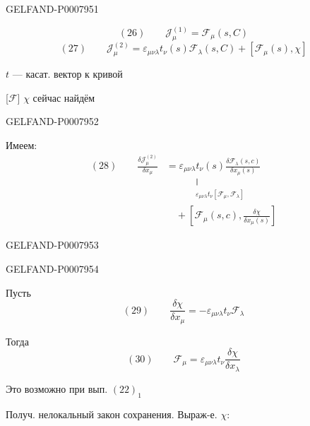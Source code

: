 \begin{GelfandAdjacentEvidence}{GELFAND-P000795}{1}

\[
(26)\qquad\mathcal{J}^{(1)}_\mu=\mathcal{F}_\mu(s,C)
\]
\[
(27)\qquad\mathcal{J}^{(2)}_\mu=
\varepsilon_{\mu\nu\lambda}t_\nu(s)\mathcal{F}_\lambda(s,C)
+[\mathcal{F}_\mu(s),\chi]
\]

\(t\) --- касат. вектор к кривой

[\sout{\(\mathcal F\)}] \(\chi\) сейчас найдём
\end{GelfandAdjacentEvidence}
\begin{GelfandAdjacentEvidence}{GELFAND-P000795}{2}


Имеем:
\[
\begin{aligned}
(28)\qquad
\frac{\delta\mathcal{J}^{(2)}_\mu}{\delta x_\mu}
&=\underset{\substack{\Vert\\
\displaystyle\varepsilon_{\mu\nu\lambda}t_\nu[\mathcal{F}_\mu,\mathcal{F}_\lambda]}}
{\varepsilon_{\mu\nu\lambda}t_\nu(s)
\frac{\delta\mathcal{F}_\lambda(s,c)}{\delta x_\mu(s)}}\\[1ex]
&\quad+\left[\mathcal{F}_\mu(s,c),\frac{\delta\chi}{\delta x_\mu(s)}\right]
\end{aligned}
\]
\end{GelfandAdjacentEvidence}
\begin{GelfandAdjacentEvidence}{GELFAND-P000795}{3}

\end{GelfandAdjacentEvidence}
\begin{GelfandAdjacentEvidence}{GELFAND-P000795}{4}


Пусть
\[
(29)\qquad \frac{\delta\chi}{\delta x_\mu}=
-\varepsilon_{\mu\nu\lambda}t_\nu\mathcal{F}_\lambda
\]

Тогда
\[
(30)\qquad\mathcal{F}_\mu=\varepsilon_{\mu\nu\lambda}t_\nu
\frac{\delta\chi}{\delta x_\lambda}
\]

Это возможно при вып. \((22)_1\)

Получ. нелокальный закон сохранения. \quad Выраж-е. \(\chi\):
\end{GelfandAdjacentEvidence}
